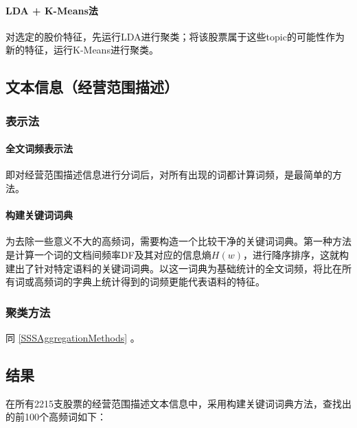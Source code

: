 \documentclass[12pt,a4paper]{article}
\begin{document}
\begin{CJK*}{UTF8}{song}
\paragraph{LDA + K-Means法}
对选定的股价特征，先运行LDA进行聚类；将该股票属于这些topic的可能性作为新的特征，运行K-Means进行聚类。

\subsection{文本信息（经营范围描述）}
\subsubsection{表示法}
\paragraph{全文词频表示法}
即对经营范围描述信息进行分词后，对所有出现的词都计算词频，是最简单的方法。

\paragraph{构建关键词词典}
为去除一些意义不大的高频词，需要构造一个比较干净的关键词词典。第一种方法是计算一个词的文档间频率DF及其对应的信息熵$H(w)$，进行降序排序，这就构建出了针对特定语料的关键词词典。以这一词典为基础统计的全文词频，将比在所有词或高频词的字典上统计得到的词频更能代表语料的特征。

\subsubsection{聚类方法}
同 \ref{SSSAggregationMethods} 。

\subsection{结果}
在所有2215支股票的经营范围描述文本信息中，采用构建关键词词典方法，查找出的前100个高频词如下：


\end{CJK*}
\end{document}

